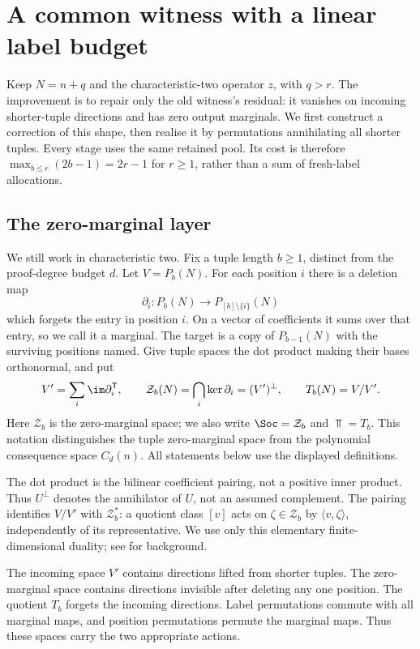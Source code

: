 \section{A common witness with a linear label budget}\label{sec:linear-construction}
Keep $N=n+q$ and the characteristic-two operator $z$, with $q>r$.
The improvement is to repair only the old witness's residual: it
vanishes on incoming shorter-tuple directions and has zero output
marginals. We first construct a correction of this shape, then
realise it by permutations annihilating all shorter tuples. Every
stage uses the same retained pool. Its cost is therefore
$\max_{b\le r}(2b-1)=2r-1$ for $r\ge1$, rather than a sum of
fresh-label allocations.

\subsection{The zero-marginal layer}\label{sec:layers}
We still work in characteristic two. Fix a tuple length $b\ge1$, distinct from the proof-degree budget $d$. Let $V=P_b(N)$. For each position $i$ there is a deletion map
\[\partial_i:P_b(N)\longrightarrow P_{[b]\setminus\{i\}}(N)
\]
which forgets the entry in position $i$. On a vector of coefficients it sums over that entry, so we call it a marginal. The target is a copy of $P_{b-1}(N)$ with the surviving positions named. Give tuple spaces the dot product making their bases orthonormal, and put
\begin{equation}\label{eq:anatomy}
V'=\sum_i\im\partial_i^{\mathsf T},\qquad
\mathcal Z_b(N)=\bigcap_i\ker\partial_i=(V')^\perp,\qquad T_b(N)=V/V'.
\end{equation}
Here $\mathcal Z_b$ is the zero-marginal space; we also write $\Soc=\mathcal Z_b$ and $\Top=T_b$. This notation distinguishes the tuple zero-marginal space from the
polynomial consequence space $C_d(n)$. All statements below use the
displayed definitions.

The dot product is the bilinear coefficient pairing, not a positive
inner product. Thus $U^\perp$ denotes the annihilator of $U$, not an
assumed complement. The pairing identifies $V/V'$ with
$\mathcal Z_b^*$: a quotient class $[v]$ acts on $\zeta\in\mathcal Z_b$
by $\langle v,\zeta\rangle$, independently of its representative.
We use only this elementary finite-dimensional duality; see
\cite{LangAlgebra} for background.

The incoming space $V'$ contains directions lifted from shorter tuples. The zero-marginal space contains directions invisible after deleting any one position. The quotient $T_b$ forgets the incoming directions. Label permutations commute with all marginal maps, and position permutations permute the marginal maps. Thus these spaces carry the two appropriate actions.

